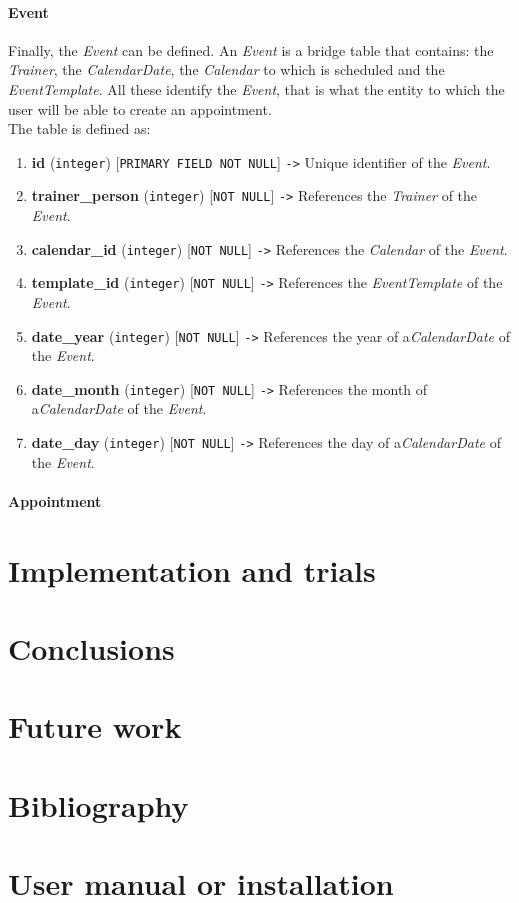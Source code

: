 \documentclass[a4paper, 12pt, oneside]{book}
\begin{document}
\subsubsection{Event}
Finally, the \emph{Event} can be defined. An \emph{Event} is a bridge table that contains: the \emph{Trainer}, the \emph{CalendarDate}, the \emph{Calendar} to which is scheduled and the \emph{EventTemplate}. All these identify the \emph{Event}, that is what the entity to which the user will be able to create an appointment.
\\[8pt]
The table is defined as:
\begin{enumerate}[label = -]
	\item \textbf{id} (\texttt{integer}) [\texttt{PRIMARY FIELD NOT NULL}] \texttt{->} Unique identifier of the \emph{Event}.
	\item \textbf{trainer\_person} (\texttt{integer}) [\texttt{NOT NULL}] \texttt{->} References the \emph{Trainer} of the \emph{Event}.
	\item \textbf{calendar\_id} (\texttt{integer}) [\texttt{NOT NULL}] \texttt{->} References the \emph{Calendar} of the \emph{Event}.
	\item \textbf{template\_id} (\texttt{integer}) [\texttt{NOT NULL}] \texttt{->} References the \emph{EventTemplate} of the \emph{Event}.
	\item \textbf{date\_year} (\texttt{integer}) [\texttt{NOT NULL}] \texttt{->} References the year of a\emph{CalendarDate} of the \emph{Event}.
	\item \textbf{date\_month} (\texttt{integer}) [\texttt{NOT NULL}] \texttt{->} References the month of a\emph{CalendarDate} of the \emph{Event}.
	\item \textbf{date\_day} (\texttt{integer}) [\texttt{NOT NULL}] \texttt{->} References the day of a\emph{CalendarDate} of the \emph{Event}.
\end{enumerate} 
\subsubsection{Appointment}
\chapter{Implementation and trials}
\chapter{Conclusions}
\chapter{Future work}
\appendix
\chapter{Bibliography}
\chapter{User manual or installation}
\end{document}
